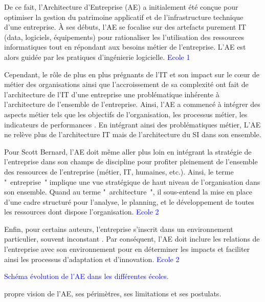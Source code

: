 De ce fait, l'Architecture d'Entreprise (AE) a initialement été conçue pour 
optimiser la 
gestion du patrimoine applicatif et de l'infrastructure technique d'une  
entreprise. À ses débuts, l'AE se 
focalise sur des artefacts purement IT (data, logiciels, équipements) pour 
rationaliser les l'utilisation des ressources informatiques 
\cite{winter2006essential} tout en répondant aux besoins métier de l'entreprise. 
L'AE est alors guidée par les pratiques d'ingénierie logicielle. 
\textcolor{blue}{Ecole 1} 
 

Cependant, le rôle de plus en plus prégnants de l'IT et son impact sur le 
c\oe{}ur de métier des organisations ainsi que l'accroissement de sa complexité 
\cite{ranganathan2005enterprise} ont fait de l'architecture de l'IT d'une 
entreprise une problématique inhérente à l'architecture de l'ensemble de 
l'entreprise. Ainsi, l'AE a commencé à intégrer des aspects métier tels que les 
objectifs de l'organisation, les processus métier, les indicateurs de 
performances \cite{winter2006essential}. En intégrant ainsi des problématiques 
métier, L'AE ne relève plus de l'architecture IT mais de l'architecture du SI 
dans son ensemble.

Pour Scott Bernard, l'AE doit même aller plus loin en intégrant la stratégie de 
l'entreprise \cite{bernard2012introduction} dans son champs de discipline pour 
profiter pleinement de l'ensemble des ressources de l'entreprise (métier, IT, 
humaines, etc.). Ainsi, le terme "~entreprise~" implique une vue stratégique de 
haut niveau de l'organisation dans son ensemble. Quand au terme 
"~architecture~", il sous-entend la mise en place d'une cadre structuré pour 
l'analyse, le planning, et le développement de toutes les ressources dont 
dispose l'organisation. \textcolor{blue}{Ecole 2} 

Enfin, pour certains auteurs, l'entreprise s'inscrit dans un environnement 
particulier, souvent inconstant \cite{lapalme2012three}. Par conséquent, l'AE 
doit inclure les relations de l'entreprise avec son environnement pour en 
déterminer les impacts et faciliter ainsi les processus d'adaptation  et 
d'innovation. \textcolor{blue}{Ecole 2}


\textcolor{blue}{Schéma évolution de l'AE dans les différentes écoles}.  



propre vision de l'AE, ses périmètres, ses limitations et ses postulats.

  
